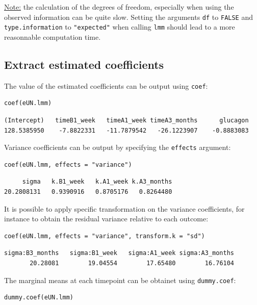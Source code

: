 \documentclass[12pt]{article}
\begin{document}
\uline{Note:} the calculation of the degrees of freedom, especially when
using the observed information can be quite slow. Setting the
arguments \texttt{df} to \texttt{FALSE} and \texttt{type.information} to \texttt{"expected"} when
calling \texttt{lmm} should lead to a more reasonnable computation time.

\subsection{Extract estimated coefficients}
\label{sec:orgab8e774}
The value of the estimated coefficients can be output using \texttt{coef}:
\lstset{language=r,label= ,caption= ,captionpos=b,numbers=none}
\begin{lstlisting}
coef(eUN.lmm)
\end{lstlisting}

\begin{verbatim}
(Intercept)   timeB1_week   timeA1_week timeA3_months      glucagon 
128.5385950    -7.8822331   -11.7879542   -26.1223907    -0.8883083
\end{verbatim}


Variance coefficients can be output by specifying the \texttt{effects} argument:
\lstset{language=r,label= ,caption= ,captionpos=b,numbers=none}
\begin{lstlisting}
coef(eUN.lmm, effects = "variance")
\end{lstlisting}

\begin{verbatim}
     sigma   k.B1_week   k.A1_week k.A3_months 
20.2808131   0.9390916   0.8705176   0.8264480
\end{verbatim}



It is possible to apply specific transformation on the variance
coefficients, for instance to obtain the residual variance relative to
each outcome:
\lstset{language=r,label= ,caption= ,captionpos=b,numbers=none}
\begin{lstlisting}
coef(eUN.lmm, effects = "variance", transform.k = "sd")
\end{lstlisting}

\begin{verbatim}
sigma:B3_months   sigma:B1_week   sigma:A1_week sigma:A3_months 
       20.28081        19.04554        17.65480        16.76104
\end{verbatim}


The marginal means at each timepoint can be obtainet using \texttt{dummy.coef}:
\lstset{language=r,label= ,caption= ,captionpos=b,numbers=none}
\begin{lstlisting}
dummy.coef(eUN.lmm)
\end{lstlisting}
\end{document}
